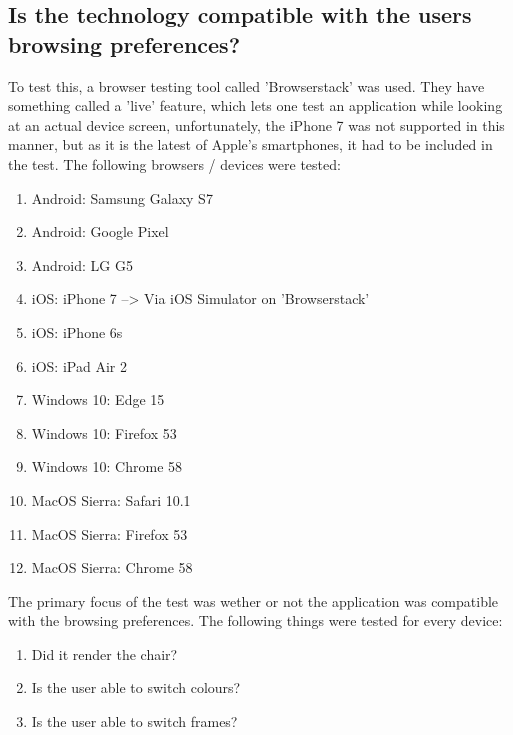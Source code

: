 \subsection{Is the technology compatible with the users browsing preferences?}
To test this, a browser testing tool called 'Browserstack' was used. They have something called a 'live' feature, which lets one test an application while looking at an actual device screen, unfortunately, the iPhone 7 was not supported in this manner, but as it is the latest of Apple's smartphones, it had to be included in the test. The following browsers / devices were tested:
​\begin{enumerate}
\item {Android: Samsung Galaxy S7}
\item {Android: Google Pixel}
\item {Android: LG G5}
\item {iOS: iPhone 7 --> Via iOS Simulator on 'Browserstack'}
\item {iOS: iPhone 6s}
\item {iOS: iPad Air 2}
\item {Windows 10: Edge 15}
\item {Windows 10: Firefox 53}
\item {Windows 10: Chrome 58}
\item {MacOS Sierra: Safari 10.1}
\item {MacOS Sierra: Firefox 53}
\item {MacOS Sierra: Chrome 58}
\end{enumerate}

The primary focus of the test was wether or not the application was compatible with the browsing preferences. The following things were tested for every device:
​\begin{enumerate}
\item {Did it render the chair?}
\item {Is the user able to switch colours?}
\item {Is the user able to switch frames?}
\end{enumerate}
